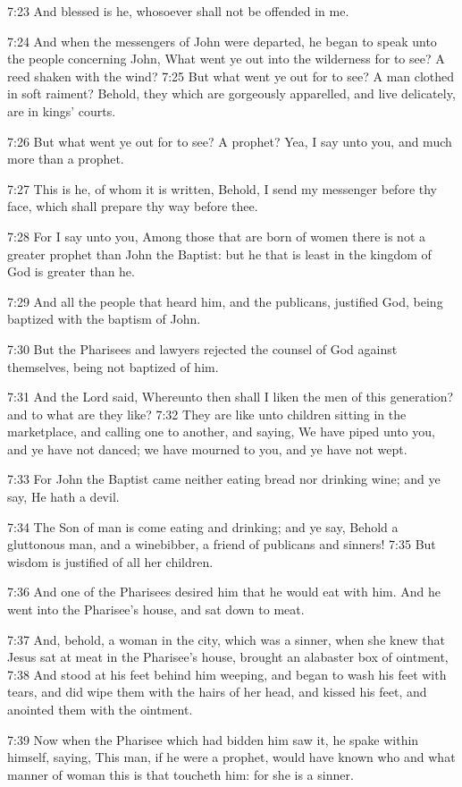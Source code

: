 7:23 And blessed is he, whosoever shall not be offended in me.

7:24 And when the messengers of John were departed, he began to speak
unto the people concerning John, What went ye out into the wilderness
for to see?  A reed shaken with the wind?  7:25 But what went ye out
for to see? A man clothed in soft raiment?  Behold, they which are
gorgeously apparelled, and live delicately, are in kings' courts.

7:26 But what went ye out for to see? A prophet? Yea, I say unto you,
and much more than a prophet.

7:27 This is he, of whom it is written, Behold, I send my messenger
before thy face, which shall prepare thy way before thee.

7:28 For I say unto you, Among those that are born of women there is
not a greater prophet than John the Baptist: but he that is least in
the kingdom of God is greater than he.

7:29 And all the people that heard him, and the publicans, justified
God, being baptized with the baptism of John.

7:30 But the Pharisees and lawyers rejected the counsel of God against
themselves, being not baptized of him.

7:31 And the Lord said, Whereunto then shall I liken the men of this
generation? and to what are they like?  7:32 They are like unto
children sitting in the marketplace, and calling one to another, and
saying, We have piped unto you, and ye have not danced; we have
mourned to you, and ye have not wept.

7:33 For John the Baptist came neither eating bread nor drinking wine;
and ye say, He hath a devil.

7:34 The Son of man is come eating and drinking; and ye say, Behold a
gluttonous man, and a winebibber, a friend of publicans and sinners!
7:35 But wisdom is justified of all her children.

7:36 And one of the Pharisees desired him that he would eat with him.
And he went into the Pharisee's house, and sat down to meat.

7:37 And, behold, a woman in the city, which was a sinner, when she
knew that Jesus sat at meat in the Pharisee's house, brought an
alabaster box of ointment, 7:38 And stood at his feet behind him
weeping, and began to wash his feet with tears, and did wipe them with
the hairs of her head, and kissed his feet, and anointed them with the
ointment.

7:39 Now when the Pharisee which had bidden him saw it, he spake
within himself, saying, This man, if he were a prophet, would have
known who and what manner of woman this is that toucheth him: for she
is a sinner.

